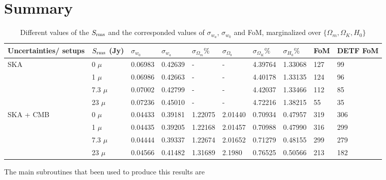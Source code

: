 \documentclass[11pt]{amsart}
\begin{document}
\section{Summary}



\begin{table*}
\caption{Different values of the $S_{\rm rms}$ and the corresponded values of $\sigma_{w_a}$, $\sigma_{w_0}$ and FoM, marginalized over $\{ \Omega_m, \Omega_K, H_0\}$}
\begin{tabular}{ |l|l|l|l||l||l|l|l|l|l|}
\hline
\hline 
\multirow{1}{*}{Uncertainties/ setups}& $S_{\rm rms}$ (Jy) & $\sigma_{w_0}$ &  $\sigma_{w_a}$ &  $\sigma_{\Omega_m} \%$ & $\sigma_{\Omega_b}$ &  $\sigma_{\Omega_K} \%$ & $\sigma_{H_0} \%$&FoM & DETF FoM \\
\hline
\multirow{4}{*}{SKA }
 & 0 $\mu$ & 0.06983 & 0.42639 &  - &   - &4.39764& 1.33068 &127 & 99 \\
 & 1 $\mu$& 0.06986 & 0.42663 &  - &   - &4.40178 & 1.33135  &124 & 96 \\
  &7.3 $\mu$& 0.07002 &0.42799 & - &   - & 4.42037 &1.33466 &112 & 85 \\ 
  & 23 $\mu$& 0.07236  & 0.45010 &- &  - & 4.72216&  1.38215 &55 &35 \\\hline
\multirow{5}{*}{SKA + CMB } 
 & 0 $\mu$ & 0.04433  & 0.39181 & 1.22075& 2.01440    &  0.70934 & 0.47957 & 319 &306 \\
 & 1 $\mu$& 0.04435& 0.39205 &1.22168 &  2.01457    & 0.70988 &0.47990 &  316 & 299\\
 &7.3 $\mu$& 0.04444 & 0.39337 &1.22674 & 2.01652     & 0.71279& 0.48155 &299 & 279\\ 
  & 23 $\mu$&0.04566 &  0.41482 &1.31689 &   2.1980  & 0.76525 &0.50566 &213 & 182\\\hline
\end{tabular}
\label{Table1:summary-wa-w0_all}
\end{table*}





The main subroutines that been used to produce this results  are
 
\end{document}
